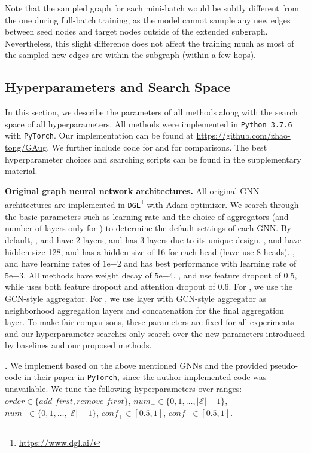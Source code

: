 \documentclass[letterpaper]{article} \usepackage{aaai21}  \usepackage{times}  \usepackage{helvet} \usepackage{courier}  \usepackage[hyphens]{url}  \usepackage{graphicx} \urlstyle{rm} \def\UrlFont{\rm}  \usepackage{natbib}  \usepackage{caption} \frenchspacing  \setlength{\pdfpagewidth}{8.5in}  \setlength{\pdfpageheight}{11in}
\begin{document}
Note that the sampled graph for each mini-batch would be subtly different from the one during full-batch training, as the model cannot sample any new edges between seed nodes and target nodes outside of the extended subgraph. Nevertheless, this slight difference does not affect the training much as most of the sampled new edges are within the subgraph (within a few hops).

\subsection{Hyperparameters and Search Space}
\label{appn:hyperparamter}
In this section, we describe the parameters of all methods along with the search space of all hyperparameters. All methods were implemented in \verb+Python 3.7.6+ with \verb+PyTorch+. Our implementation can be found at \url{https://github.com/zhao-tong/GAug}.  We further include code for \adaedge \cite{chen2019measuring} and \dropedge \cite{rong2019dropedge} for comparisons. The best hyperparameter choices and searching scripts can be found in the supplementary material.

\noindent \textbf{Original graph neural network architectures.} All original GNN architectures are implemented in \verb+DGL+\footnote{\url{https://www.dgl.ai/}} with Adam optimizer. We search through the basic parameters such as  learning rate and the choice of aggregators (and number of layers only for \jknet) to determine the default settings of each GNN. By default, \gcn, \gsage and \gat have 2 layers, and \jknet has 3 layers due to its unique design.  \gcn, \gsage and \jknet have hidden size 128, and \gat has a hidden size of 16 for each head (have use 8 heads). \gcn, \gsage and \jknet have learning rates of $1\mathrm{e}{-2}$ and \gat has best performance with learning rate of $5\mathrm{e}{-3}$. All methods have weight decay of $5\mathrm{e}{-4}$. \gcn, \gsage and \jknet use feature dropout of 0.5, while \gat uses both feature dropout and attention dropout of 0.6. For \gsage, we use the GCN-style aggregator. For \jknet, we use \gsage layer with GCN-style aggregator as neighborhood aggregation layers and concatenation for the final aggregation layer. To make fair comparisons, these parameters are fixed for all experiments and our hyperparameter searches only search over the new parameters introduced by baselines and our proposed methods.

\noindent \textbf{\adaedge.} We implement \adaedge \cite{chen2019measuring} based on the above mentioned GNNs and the provided pseudo-code in their paper in \verb+PyTorch+, since the author-implemented code was unavailable. We tune the following hyperparameters over ranges: $order \in \{add\_first, remove\_first\}$, $num_+ \in \{0, 1, \dots, |\mathcal{E}|-1\}$, $num_- \in \{0, 1, \dots, |\mathcal{E}|-1\}$, $conf_+ \in [0.5, 1]$, $conf_- \in [0.5, 1]$.
\end{document}
